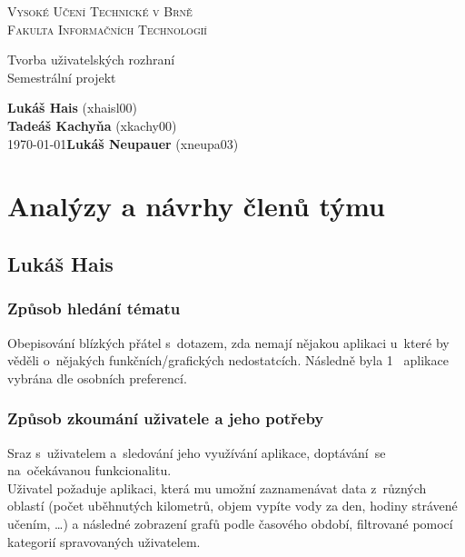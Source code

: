 \documentclass[12pt, titlepage]{article}
\begin{document}
\begin{titlepage}
    \begin{center}
        \textsc{\Huge{Vysoké Učení Technické v Brně\\[0.3em]}}
        \textsc{\huge{Fakulta Informačních Technologií}}
        
        
        \LARGE{Tvorba uživatelských rozhraní\\}
        \Huge{Semestrální projekt}
        
    \end{center}
    {\Large \phantom{} \hfill \textbf{Lukáš Hais} (xhaisl00)\\
		\phantom{} \hfill \textbf{Tadeáš Kachyňa} (xkachy00)\\
		\today \hfill \textbf{Lukáš Neupauer} (xneupa03)}
\end{titlepage}

\tableofcontents
\newpage

\section{Analýzy a návrhy členů týmu}

\subsection{Lukáš Hais}
\subsubsection{Způsob hledání tématu}
Obepisování blízkých přátel s~dotazem, zda nemají nějakou aplikaci u~které by věděli o~nějakých funkčních/grafických nedostatcích. Následně byla 1~
aplikace vybrána dle osobních preferencí.
\subsubsection{Způsob zkoumání uživatele a jeho potřeby}
Sraz s~uživatelem a~sledování jeho využívání aplikace, doptávání~se na~očekávanou funkcionalitu.\\
Uživatel požaduje aplikaci, která mu umožní zaznamenávat data z~různých oblastí (počet uběhnutých kilometrů, objem vypíte vody za den, hodiny strávené učením,  \ldots) a následné zobrazení grafů podle časového období, filtrované pomocí kategorií spravovaných uživatelem.
\end{document}
